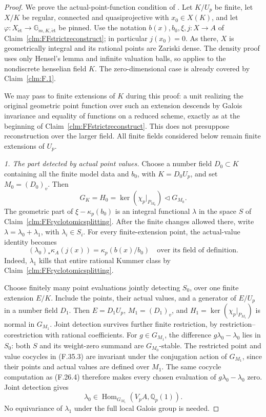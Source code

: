 \documentclass[11pt]{article}
\begin{document}
\begin{proof}
We prove the actual-point-function condition of
\citet[Theorem~4.18(5)]{FF_CHW2024}. Let \(K/U_p\)
be finite, let \(X/K\) be regular, connected and
quasiprojective with \(x_0\in X(K)\), and let
\(\varphi:X_{\mathrm{\acute et}}\to
\mathbb G_{m,K,\mathrm{\acute et}}\) be pinned.
Use the notation \(b(x),b_0,\xi,j:X\to A\) of
Claim~\ref{clm:FFstrictreconstruct}; in particular
\(j(x_0)=0\). As there, \(X\) is geometrically
integral and its rational points are Zariski dense.
The density proof uses only Hensel's lemma and
infinite valuation balls, so applies to the
nondiscrete henselian field \(K\).
The zero-dimensional case is already covered by
Claim~\ref{clm:F.1}.

We may pass to finite extensions of \(K\) during
this proof: a unit realizing the original geometric
point function over such an extension descends by
Galois invariance and equality of functions on a
reduced scheme, exactly as at the beginning of
Claim~\ref{clm:FFstrictreconstruct}. This does not
presuppose reconstruction over the larger field.
All finite fields considered below remain finite
extensions of \(U_p\).

\emph{1. The part detected by actual point values.}
Choose a number field \(D_0\subset K\) containing
all the finite model data and \(b_0\), with
\(K=D_0U_p\), and set \(M_0=(D_0)_v\).
Then
\[
 G_K=H_0=\ker(\chi_p|_{P_{M_0}})
                  \triangleleft G_{M_0}.
                                                        \tag{F.35.2}
\]
The geometric part of \(\xi-\kappa_p(b_0)\)
is an integral functional \(\lambda\) in the
space \(S\) of Claim~\ref{clm:FFcyclotomicsplitting}.
After the finite changes allowed there, write
\(\lambda=\lambda_0+\lambda_1\), with
\(\lambda_i\in S_i\). For every finite-extension
point, the actual-value identity becomes
\[
  (\lambda_0)_*\kappa_A(j(x))
                =\kappa_p(b(x)/b_0)
               \quad\text{over its field of definition}.
                                                        \tag{F.35.3}
\]
Indeed, \(\lambda_1\) kills that entire rational
Kummer class by Claim~\ref{clm:FFcyclotomicsplitting}.

Choose finitely many point evaluations jointly
detecting \(S_0\), over one finite extension \(E/K\).
Include the points, their actual values, and a
generator of \(E/U_p\) in a number field \(D_1\).
Then \(E=D_1U_p\), \(M_1=(D_1)_v\), and
\(H_1=\ker(\chi_p|_{P_{M_1}})\) is normal in
\(G_{M_1}\). Joint detection survives further
finite restriction, by restriction--corestriction
with rational coefficients.
For \(g\in G_{M_1}\), the difference
\(g\lambda_0-\lambda_0\) lies in \(S_0\):
both \(S\) and its weight-zero summand are
\(G_{M_0}\)-stable. The restricted point and
value cocycles in (F.35.3) are invariant under
the conjugation action of \(G_{M_1}\), since
their points and actual values are defined over
\(M_1\). The same cocycle computation as
(F.26.4) therefore makes every chosen evaluation
of \(g\lambda_0-\lambda_0\) zero. Joint detection
gives
\[
                \lambda_0\in
             \operatorname{Hom}_{G_{M_1}}(V_pA,\mathbb Q_p(1)).
                                                        \tag{F.35.4}
\]
No equivariance of \(\lambda_1\) under the full
local Galois group is needed.


\end{proof}
\end{document}
